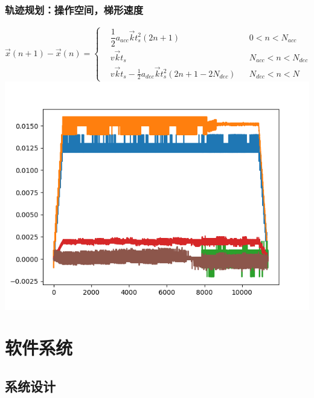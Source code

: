 \documentclass{beamer}
\begin{document}
\begin{frame}
    \frametitle{轨迹规划：操作空间，梯形速度}
    \[
        \vec x(n+1)- \vec x(n) = \left\{\begin{aligned}
             & \dfrac{1}{2} a_{acc} \vec k t_s^2(2n+1)                      &  & 0<n<N_{acc}       \\
             & v\vec kt_s                                                   &  & N_{acc}<n<N_{dec} \\
             & v \vec k t_s-\frac{1}{2} a_{dec} \vec k t_s^2(2n+1-2N_{dec}) &  & N_{dec}<n<N
        \end{aligned}\right.
    \]
    \centering
    \includegraphics[scale=0.32]{轨迹规划.png}
\end{frame}


\section{软件系统}

\subsection{系统设计}
\end{document}
